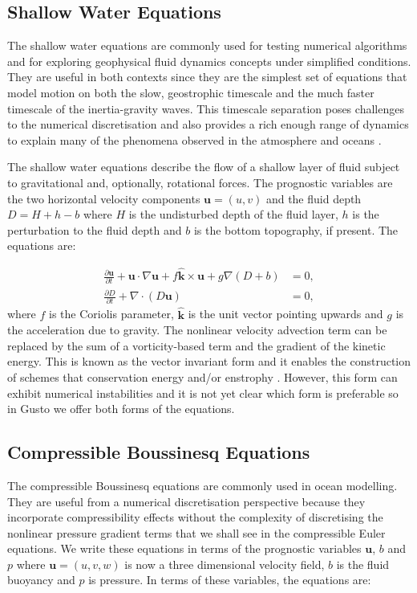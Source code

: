 \documentclass[journal abbreviation, manuscript]{copernicus}
\def\MM#1{\boldsymbol{#1}}
\newcommand{\pp}[2]{\frac{\partial #1}{\partial #2}}
\begin{document}
\subsection{Shallow Water Equations}
The shallow water equations are commonly used for testing numerical
algorithms and for exploring geophysical fluid dynamics concepts under
simplified conditions. They are useful in both contexts since they are
the simplest set of equations that model motion on both the slow,
geostrophic timescale and the much faster timescale of the
inertia-gravity waves. This timescale separation poses challenges to
the numerical discretisation and also provides a rich enough range of
dynamics to explain many of the phenomena observed in the atmosphere
and oceans \citep{zeitlin2018geophysical}.

The shallow water equations describe the flow of a shallow layer of
fluid subject to gravitational and, optionally, rotational forces. The
prognostic variables are the two horizontal velocity components
$\MM{u} = (u, v)$ and the fluid depth $D = H + h - b$ where $H$ is the
undisturbed depth of the fluid layer, $h$ is the perturbation to the
fluid depth and $b$ is the bottom topography, if present. The
equations are:

\begin{align}
  \pp{\MM{u}}{t} + \MM{u}\cdot\nabla\MM{u} + f\hat{\MM{k}}\times\MM{u} + g\nabla (D+b) &= 0, \\
  \pp{D}{t} + \nabla\cdot(D\MM{u}) &= 0,
\end{align}
where $f$ is the Coriolis parameter, $\hat{\MM{k}}$ is the unit vector
pointing upwards and $g$ is the acceleration due to gravity. The
nonlinear velocity advection term can be replaced by the sum of a
vorticity-based term and the gradient of the kinetic energy. This is
known as the vector invariant form and it enables the construction of
schemes that conservation energy and/or enstrophy
\citep{mcrae2014energy, bauer2018energy, wimmer2020energy,
  wimmer2021energy}. However, this form can exhibit numerical
instabilities \citep{bell2017numerical} and it is not yet clear which
form is preferable so in Gusto we offer both forms of the equations.

\subsection{Compressible Boussinesq Equations}
The compressible Boussinesq equations are commonly used in ocean
modelling. They are useful from a numerical discretisation perspective
because they incorporate compressibility effects without the
complexity of discretising the nonlinear pressure gradient terms that
we shall see in the compressible Euler equations. We write these
equations in terms of the prognostic variables $\MM{u}$, $b$ and
$p$ where $\MM{u}=(u, v, w)$ is now a three dimensional velocity
field, $b$ is the fluid buoyancy and $p$ is pressure. In terms of
these variables, the equations are:
\end{document}
